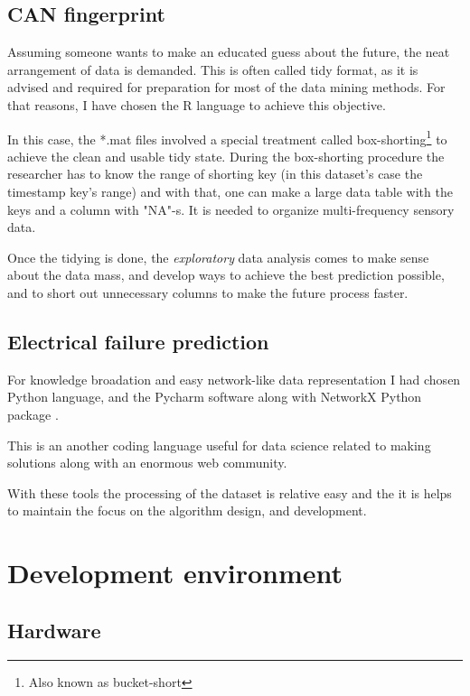 		\subsection{CAN fingerprint}
Assuming someone wants to make an educated guess about the future, the neat arrangement of data is demanded. This is often called tidy \cite{Tidy} format, as it is advised and required for preparation for most of the data mining methods. For that reasons, I have chosen the R language to achieve this objective.

In this case, the *.mat files involved a special treatment called box-shorting\footnote{Also known as bucket-short} \cite{Bucketshort} to achieve the clean and usable tidy state. During the box-shorting procedure the researcher has to know the range of shorting key (in this dataset's case the timestamp key's range) and with that, one can make a large data table with the keys and a column with "NA"-s. It is needed to organize multi-frequency sensory data.

Once the tidying is done, the \textit{exploratory} data analysis comes to make sense about the data mass, and develop ways to achieve the best prediction possible, and to short out unnecessary columns to make the future process faster.

		\subsection{Electrical failure prediction}
For knowledge broadation and easy network-like data representation I had chosen Python language, and the Pycharm software \cite{PyCharm} along with NetworkX Python package \cite{NetworkX}.

This is an another coding language useful for data science related to making solutions along with an enormous web community. 

With these tools the processing of the dataset is relative easy and the it is helps to maintain the focus on the algorithm design, and development.
	\section{Development environment}
		\subsection{Hardware}
